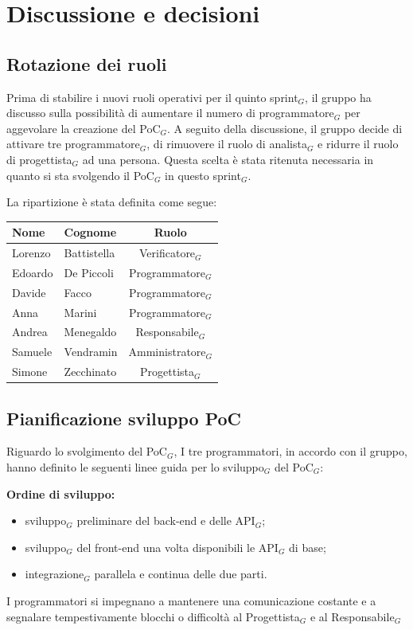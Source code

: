 \documentclass[a4paper, 10pt, colorlinks=true, linkcolor=black, urlcolor=blue, citecolor=blue, hidelinks]{article}
\begin{document}
\section{Discussione e decisioni}

\subsection{Rotazione dei ruoli}
Prima di stabilire i nuovi ruoli operativi per il quinto sprint$_G$, il gruppo ha discusso sulla possibilità di aumentare il numero di programmatore$_G$ per aggevolare la creazione del PoC$_G$. 
A seguito della discussione, il gruppo decide di attivare tre programmatore$_G$, di rimuovere il ruolo di analista$_G$ e ridurre il ruolo di progettista$_G$ ad una persona. Questa scelta è stata ritenuta necessaria in quanto si sta svolgendo il PoC$_G$ in questo sprint$_G$.

La ripartizione è stata definita come segue:
\begin{center}
    \begin{tabular}{|l|l|c|}
        \hline
        \textbf{Nome} & \textbf{Cognome} & \textbf{Ruolo} \\
        \hline
        Lorenzo & Battistella & Verificatore$_G$ \\
        \hline
        Edoardo & De Piccoli & Programmatore$_G$ \\
        \hline
        Davide & Facco & Programmatore$_G$ \\ 
        \hline
        Anna & Marini & Programmatore$_G$ \\
        \hline
        Andrea & Menegaldo & Responsabile$_G$ \\
        \hline
        Samuele & Vendramin & Amministratore$_G$ \\        
        \hline  
        Simone & Zecchinato & Progettista$_G$ \\
        \hline  
    \end{tabular}
\end{center}


\subsection{Pianificazione sviluppo PoC}
Riguardo lo svolgimento del PoC$_G$, I tre programmatori, in accordo con il gruppo, hanno definito le seguenti linee guida per lo sviluppo$_G$ del PoC$_G$:

\textbf{Ordine di sviluppo:} 
\begin{itemize}
    \item sviluppo$_G$ preliminare del back-end e delle API$_G$;
    \item sviluppo$_G$ del front-end una volta disponibili le API$_G$ di base;
    \item integrazione$_G$ parallela e continua delle due parti.
\end{itemize}
I programmatori si impegnano a mantenere una comunicazione costante e a segnalare tempestivamente blocchi o difficoltà al Progettista$_G$ e al Responsabile$_G$
\end{document}
